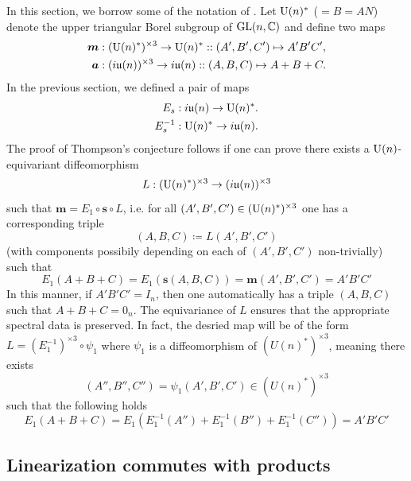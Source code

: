 \documentclass[notitlepage]{article}
\begin{document}
In this section, we borrow some of the notation of \citeauthor{lu2003thompson} \cite{lu2003thompson}.
Let $\operatorname{U}(n)^{*}$ ($= B = AN$) denote the upper triangular Borel subgroup of $\operatorname{GL}(n,\mathbb C)$ and define two maps
\begin{align}
    \boldsymbol{m} &: (\operatorname{U}(n)^{*})^{\times 3} \to \operatorname{U}(n)^{*} :: (A', B', C') \mapsto A'B'C', \\
    \boldsymbol{a} &: (i \mathfrak u(n))^{\times 3} \to i\mathfrak u(n) :: (A, B, C) \mapsto A + B + C.
\end{align}
In the previous section, we defined a pair of maps
\begin{align}
    E_s &: i \mathfrak u(n) \to \operatorname{U}(n)^{*}. \\
    E_s^{-1} &: \operatorname{U}(n)^{*} \to i \mathfrak u(n).
\end{align}
The proof of Thompson's conjecture follows if one can prove there exists a $\operatorname{U}(n)$-equivariant diffeomorphism 
\begin{equation}
    L : (\operatorname{U}(n)^{*})^{\times 3} \to (i \mathfrak u(n))^{\times 3}
\end{equation}
such that $\boldsymbol{m} = E_1 \circ \boldsymbol{s} \circ L$, i.e. for all $(A', B', C') \in (\operatorname{U}(n)^{*})^{\times 3}$ one has a corresponding triple 
\begin{equation}
    (A, B, C) \coloneqq L(A', B', C')
\end{equation}
(with components possibily depending on each of $(A', B', C')$ non-trivially) such that
\begin{equation}
    E_1(A+B+C) = E_1(\boldsymbol{s}(A,B,C)) = \boldsymbol{m}(A',B',C') = A' B' C'
\end{equation}
In this manner, if $A'B'C' = I_n$, then one automatically has a triple $(A,B,C)$ such that $A+B+C = 0_n$.
The equivariance of $L$ ensures that the appropriate spectral data is preserved.
In fact, the desried map will be of the form $L = (E^{-1}_1)^{\times 3} \circ \psi_1$ where $\psi_1$ is a diffeomorphism of $(U(n)^{*})^{\times 3}$, meaning there exists 
\begin{equation}
    (A'', B'', C'') = \psi_1(A', B', C') \in (U(n)^{*})^{\times 3}
\end{equation}
such that the following holds
\begin{equation}
    E_1(A+B+C) = E_1(E^{-1}_1(A'')+E^{-1}_1(B'')+E^{-1}_1(C'')) = A' B' C'
\end{equation}

\subsection{Linearization commutes with products}
\end{document}
